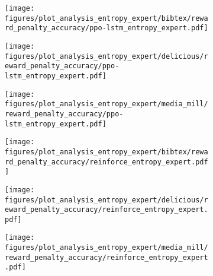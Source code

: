 \begin{figure}[H]
    \begin{subfigure}[b]{0.32\columnwidth}
        \centering
        \texttt{[image: figures/plot\_analysis\_entropy\_expert/bibtex/reward\_penalty\_accuracy/ppo-lstm\_entropy\_expert.pdf]}
    \end{subfigure}
    \hfill
    \begin{subfigure}[b]{0.32\columnwidth}
        \centering
        \texttt{[image: figures/plot\_analysis\_entropy\_expert/delicious/reward\_penalty\_accuracy/ppo-lstm\_entropy\_expert.pdf]}
    \end{subfigure}
    \hfill
    \begin{subfigure}[b]{0.32\columnwidth}
        \centering
        \texttt{[image: figures/plot\_analysis\_entropy\_expert/media\_mill/reward\_penalty\_accuracy/ppo-lstm\_entropy\_expert.pdf]}
    \end{subfigure}
    \hfill

    \begin{subfigure}[b]{0.32\columnwidth}
        \centering
        \texttt{[image: figures/plot\_analysis\_entropy\_expert/bibtex/reward\_penalty\_accuracy/reinforce\_entropy\_expert.pdf]}
    \end{subfigure}
    \hfill
    \begin{subfigure}[b]{0.32\columnwidth}
        \centering
        \texttt{[image: figures/plot\_analysis\_entropy\_expert/delicious/reward\_penalty\_accuracy/reinforce\_entropy\_expert.pdf]}
    \end{subfigure}
    \hfill
    \begin{subfigure}[b]{0.32\columnwidth}
        \centering
        \texttt{[image: figures/plot\_analysis\_entropy\_expert/media\_mill/reward\_penalty\_accuracy/reinforce\_entropy\_expert.pdf]}
    \end{subfigure}
    \hfill


\end{figure}
